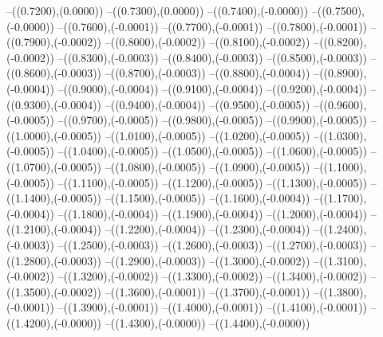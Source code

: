 {	--({\sx*(0.7200)},{\sy*(0.0000)})
	--({\sx*(0.7300)},{\sy*(0.0000)})
	--({\sx*(0.7400)},{\sy*(-0.0000)})
	--({\sx*(0.7500)},{\sy*(-0.0000)})
	--({\sx*(0.7600)},{\sy*(-0.0001)})
	--({\sx*(0.7700)},{\sy*(-0.0001)})
	--({\sx*(0.7800)},{\sy*(-0.0001)})
	--({\sx*(0.7900)},{\sy*(-0.0002)})
	--({\sx*(0.8000)},{\sy*(-0.0002)})
	--({\sx*(0.8100)},{\sy*(-0.0002)})
	--({\sx*(0.8200)},{\sy*(-0.0002)})
	--({\sx*(0.8300)},{\sy*(-0.0003)})
	--({\sx*(0.8400)},{\sy*(-0.0003)})
	--({\sx*(0.8500)},{\sy*(-0.0003)})
	--({\sx*(0.8600)},{\sy*(-0.0003)})
	--({\sx*(0.8700)},{\sy*(-0.0003)})
	--({\sx*(0.8800)},{\sy*(-0.0004)})
	--({\sx*(0.8900)},{\sy*(-0.0004)})
	--({\sx*(0.9000)},{\sy*(-0.0004)})
	--({\sx*(0.9100)},{\sy*(-0.0004)})
	--({\sx*(0.9200)},{\sy*(-0.0004)})
	--({\sx*(0.9300)},{\sy*(-0.0004)})
	--({\sx*(0.9400)},{\sy*(-0.0004)})
	--({\sx*(0.9500)},{\sy*(-0.0005)})
	--({\sx*(0.9600)},{\sy*(-0.0005)})
	--({\sx*(0.9700)},{\sy*(-0.0005)})
	--({\sx*(0.9800)},{\sy*(-0.0005)})
	--({\sx*(0.9900)},{\sy*(-0.0005)})
	--({\sx*(1.0000)},{\sy*(-0.0005)})
	--({\sx*(1.0100)},{\sy*(-0.0005)})
	--({\sx*(1.0200)},{\sy*(-0.0005)})
	--({\sx*(1.0300)},{\sy*(-0.0005)})
	--({\sx*(1.0400)},{\sy*(-0.0005)})
	--({\sx*(1.0500)},{\sy*(-0.0005)})
	--({\sx*(1.0600)},{\sy*(-0.0005)})
	--({\sx*(1.0700)},{\sy*(-0.0005)})
	--({\sx*(1.0800)},{\sy*(-0.0005)})
	--({\sx*(1.0900)},{\sy*(-0.0005)})
	--({\sx*(1.1000)},{\sy*(-0.0005)})
	--({\sx*(1.1100)},{\sy*(-0.0005)})
	--({\sx*(1.1200)},{\sy*(-0.0005)})
	--({\sx*(1.1300)},{\sy*(-0.0005)})
	--({\sx*(1.1400)},{\sy*(-0.0005)})
	--({\sx*(1.1500)},{\sy*(-0.0005)})
	--({\sx*(1.1600)},{\sy*(-0.0004)})
	--({\sx*(1.1700)},{\sy*(-0.0004)})
	--({\sx*(1.1800)},{\sy*(-0.0004)})
	--({\sx*(1.1900)},{\sy*(-0.0004)})
	--({\sx*(1.2000)},{\sy*(-0.0004)})
	--({\sx*(1.2100)},{\sy*(-0.0004)})
	--({\sx*(1.2200)},{\sy*(-0.0004)})
	--({\sx*(1.2300)},{\sy*(-0.0004)})
	--({\sx*(1.2400)},{\sy*(-0.0003)})
	--({\sx*(1.2500)},{\sy*(-0.0003)})
	--({\sx*(1.2600)},{\sy*(-0.0003)})
	--({\sx*(1.2700)},{\sy*(-0.0003)})
	--({\sx*(1.2800)},{\sy*(-0.0003)})
	--({\sx*(1.2900)},{\sy*(-0.0003)})
	--({\sx*(1.3000)},{\sy*(-0.0002)})
	--({\sx*(1.3100)},{\sy*(-0.0002)})
	--({\sx*(1.3200)},{\sy*(-0.0002)})
	--({\sx*(1.3300)},{\sy*(-0.0002)})
	--({\sx*(1.3400)},{\sy*(-0.0002)})
	--({\sx*(1.3500)},{\sy*(-0.0002)})
	--({\sx*(1.3600)},{\sy*(-0.0001)})
	--({\sx*(1.3700)},{\sy*(-0.0001)})
	--({\sx*(1.3800)},{\sy*(-0.0001)})
	--({\sx*(1.3900)},{\sy*(-0.0001)})
	--({\sx*(1.4000)},{\sy*(-0.0001)})
	--({\sx*(1.4100)},{\sy*(-0.0001)})
	--({\sx*(1.4200)},{\sy*(-0.0000)})
	--({\sx*(1.4300)},{\sy*(-0.0000)})
	--({\sx*(1.4400)},{\sy*(-0.0000)})
}

